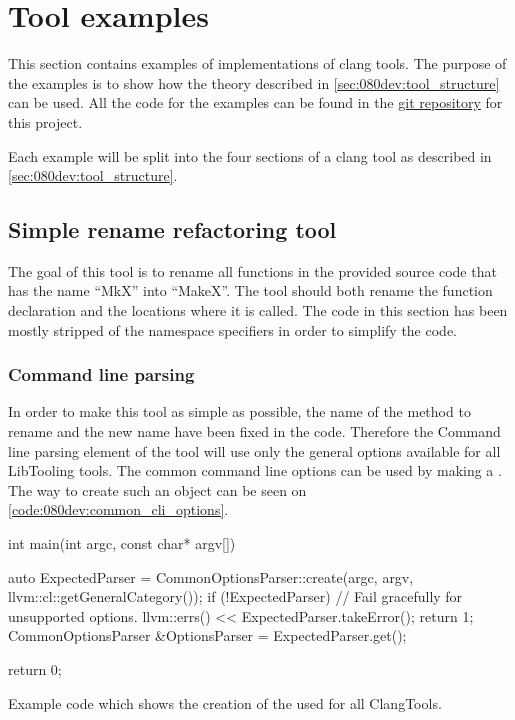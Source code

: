 \section{Tool examples}

This section contains examples of implementations of clang tools. The purpose of the examples is to show how the theory described in \cref{sec:080dev:tool_structure} can be used. All the code for the examples can be found in the \href{https://github.com/mortenhaahr/RD/tree/main/examples}{git repository} for this project. 

Each example will be split into the four sections of a clang tool as described in \cref{sec:080dev:tool_structure}.

\subsection{Simple rename refactoring tool} \label{subsec:080dev:example:simple_rename}

The goal of this tool is to rename all functions in the provided source code that has the name ``MkX'' into ``MakeX''. The tool should both rename the function declaration and the locations where it is called. The code in this section has been mostly stripped of the namespace specifiers in order to simplify the code.

\subsubsection*{Command line parsing}

In order to make this tool as simple as possible, the name of the method to rename and the new name have been fixed in the code. Therefore the Command line parsing element of the tool will use only the general options available for all LibTooling tools. The common command line options can be used by making a . The way to create such an object can be seen on \cref{code:080dev:common_cli_options}.

\begin{listing}[H]
    \begin{cppcode}
int main(int argc, const char* argv[]) {
	auto ExpectedParser = CommonOptionsParser::create(argc, argv, llvm::cl::getGeneralCategory());
	if (!ExpectedParser) {
		// Fail gracefully for unsupported options.
		llvm::errs() << ExpectedParser.takeError();
		return 1;
	}
	CommonOptionsParser &OptionsParser = ExpectedParser.get();

    return 0;
}
    \end{cppcode}
    \caption{Example code which shows the creation of the  used for all ClangTools.}
    \label{code:080dev:common_cli_options}
\end{listing}

